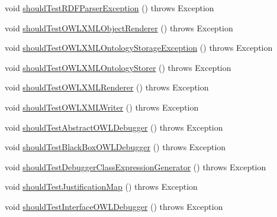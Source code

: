 \begin{DoxyCompactItemize}
\item 
void \hyperlink{classorg_1_1semanticweb_1_1owlapi_1_1contract_1_1_contract_smalls_test_a87ea6544abca0021e45904cb5b393554}{should\-Test\-R\-D\-F\-Parser\-Exception} ()  throws Exception 
\item 
void \hyperlink{classorg_1_1semanticweb_1_1owlapi_1_1contract_1_1_contract_smalls_test_a48934f1dab671d7fddbdd95e1d0e9416}{should\-Test\-O\-W\-L\-X\-M\-L\-Object\-Renderer} ()  throws Exception 
\item 
void \hyperlink{classorg_1_1semanticweb_1_1owlapi_1_1contract_1_1_contract_smalls_test_a311b330b925211a0837c755a183af7c9}{should\-Test\-O\-W\-L\-X\-M\-L\-Ontology\-Storage\-Exception} ()  throws Exception 
\item 
void \hyperlink{classorg_1_1semanticweb_1_1owlapi_1_1contract_1_1_contract_smalls_test_a41946619a7842fa13720bdbf5567f962}{should\-Test\-O\-W\-L\-X\-M\-L\-Ontology\-Storer} ()  throws Exception 
\item 
void \hyperlink{classorg_1_1semanticweb_1_1owlapi_1_1contract_1_1_contract_smalls_test_adb457ab1ecc921129331105d52a1de79}{should\-Test\-O\-W\-L\-X\-M\-L\-Renderer} ()  throws Exception 
\item 
void \hyperlink{classorg_1_1semanticweb_1_1owlapi_1_1contract_1_1_contract_smalls_test_a669998ccf1f05daf4309c7d7ad079a52}{should\-Test\-O\-W\-L\-X\-M\-L\-Writer} ()  throws Exception 
\item 
void \hyperlink{classorg_1_1semanticweb_1_1owlapi_1_1contract_1_1_contract_smalls_test_a61ff3c3767b42dc4f21289109b27df36}{should\-Test\-Abstract\-O\-W\-L\-Debugger} ()  throws Exception 
\item 
void \hyperlink{classorg_1_1semanticweb_1_1owlapi_1_1contract_1_1_contract_smalls_test_adf43534cdceb474d6c0c4669070ea841}{should\-Test\-Black\-Box\-O\-W\-L\-Debugger} ()  throws Exception 
\item 
void \hyperlink{classorg_1_1semanticweb_1_1owlapi_1_1contract_1_1_contract_smalls_test_ae8d146cac212fef7389e17d95416ac6b}{should\-Test\-Debugger\-Class\-Expression\-Generator} ()  throws Exception 
\item 
void \hyperlink{classorg_1_1semanticweb_1_1owlapi_1_1contract_1_1_contract_smalls_test_a6f0cab398dbb352ae161a8b13c6311c8}{should\-Test\-Justification\-Map} ()  throws Exception 
\item 
void \hyperlink{classorg_1_1semanticweb_1_1owlapi_1_1contract_1_1_contract_smalls_test_a586cb19f32993d6a1f010853ddd73f48}{should\-Test\-Interface\-O\-W\-L\-Debugger} ()  throws Exception 
\end{DoxyCompactItemize}


